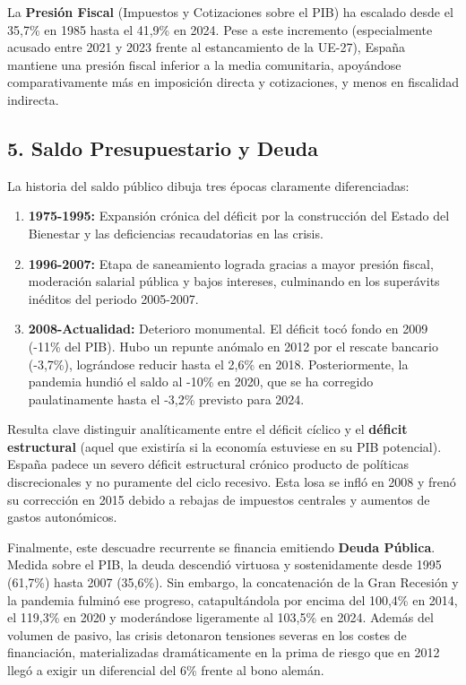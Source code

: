 La \textbf{Presión Fiscal} (Impuestos y Cotizaciones sobre el PIB) ha escalado desde el 35,7\% en 1985 hasta el 41,9\% en 2024. Pese a este incremento (especialmente acusado entre 2021 y 2023 frente al estancamiento de la UE-27), España mantiene una presión fiscal inferior a la media comunitaria, apoyándose comparativamente más en imposición directa y cotizaciones, y menos en fiscalidad indirecta.

\subsection*{5. Saldo Presupuestario y Deuda}

La historia del saldo público dibuja tres épocas claramente diferenciadas:

\begin{enumerate}
  \item \textbf{1975-1995:} Expansión crónica del déficit por la construcción del Estado del Bienestar y las deficiencias recaudatorias en las crisis.
  \item \textbf{1996-2007:} Etapa de saneamiento lograda gracias a mayor presión fiscal, moderación salarial pública y bajos intereses, culminando en los superávits inéditos del periodo 2005-2007.
  \item \textbf{2008-Actualidad:} Deterioro monumental. El déficit tocó fondo en 2009 (-11\% del PIB). Hubo un repunte anómalo en 2012 por el rescate bancario (-3,7\%), lográndose reducir hasta el 2,6\% en 2018. Posteriormente, la pandemia hundió el saldo al -10\% en 2020, que se ha corregido paulatinamente hasta el -3,2\% previsto para 2024.
\end{enumerate}

Resulta clave distinguir analíticamente entre el déficit cíclico y el \textbf{déficit estructural} (aquel que existiría si la economía estuviese en su PIB potencial). España padece un severo déficit estructural crónico producto de políticas discrecionales y no puramente del ciclo recesivo. Esta losa se infló en 2008 y frenó su corrección en 2015 debido a rebajas de impuestos centrales y aumentos de gastos autonómicos.

Finalmente, este descuadre recurrente se financia emitiendo \textbf{Deuda Pública}. Medida sobre el PIB, la deuda descendió virtuosa y sostenidamente desde 1995 (61,7\%) hasta 2007 (35,6\%). Sin embargo, la concatenación de la Gran Recesión y la pandemia fulminó ese progreso, catapultándola por encima del 100,4\% en 2014, el 119,3\% en 2020 y moderándose ligeramente al 103,5\% en 2024. Además del volumen de pasivo, las crisis detonaron tensiones severas en los costes de financiación, materializadas dramáticamente en la prima de riesgo que en 2012 llegó a exigir un diferencial del 6\% frente al bono alemán.
 
